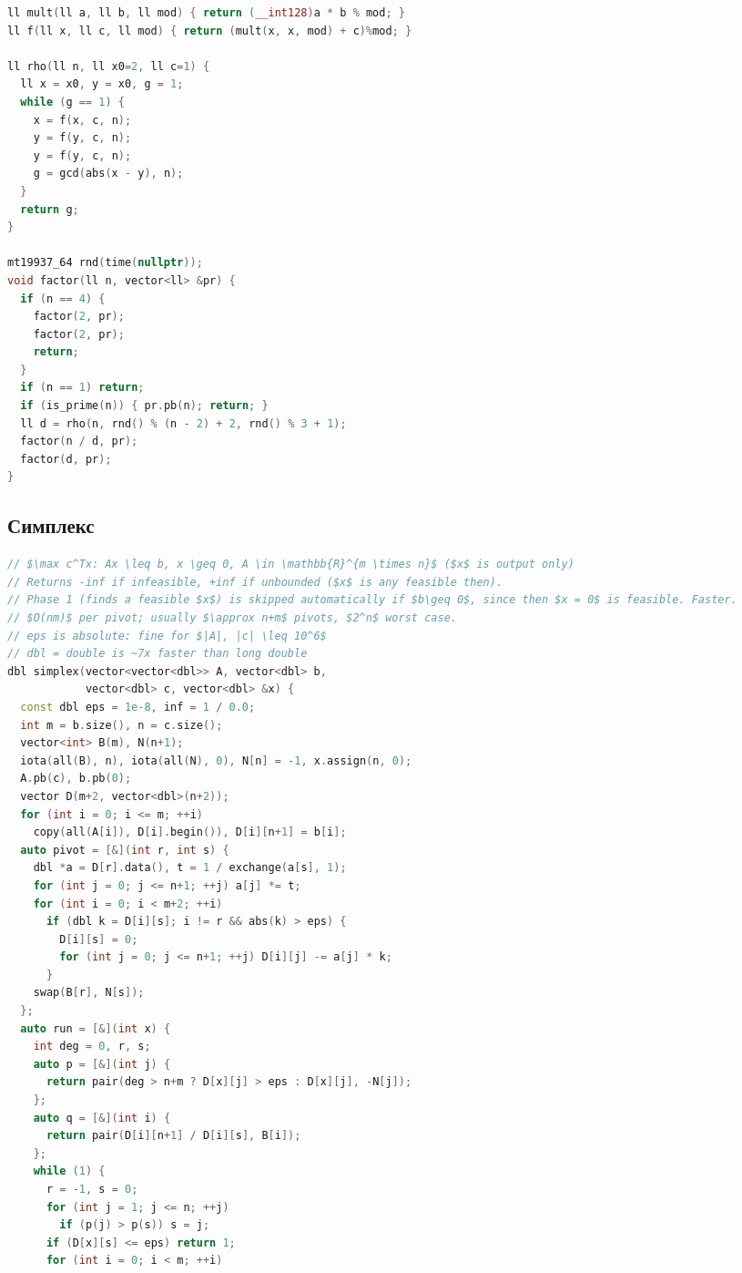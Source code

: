\documentclass[8pt,a4paper,landscape,twosided]{extarticle}
\begin{document}
\begin{multicols*}{3}
\begin{lstlisting}[language=C++]
ll mult(ll a, ll b, ll mod) { return (__int128)a * b % mod; }
ll f(ll x, ll c, ll mod) { return (mult(x, x, mod) + c)%mod; }

ll rho(ll n, ll x0=2, ll c=1) {
  ll x = x0, y = x0, g = 1;
  while (g == 1) {
    x = f(x, c, n);
    y = f(y, c, n);
    y = f(y, c, n);
    g = gcd(abs(x - y), n);
  }
  return g;
}

mt19937_64 rnd(time(nullptr));
void factor(ll n, vector<ll> &pr) {
  if (n == 4) {
    factor(2, pr);
    factor(2, pr);
    return;
  }
  if (n == 1) return;
  if (is_prime(n)) { pr.pb(n); return; }
  ll d = rho(n, rnd() % (n - 2) + 2, rnd() % 3 + 1);
  factor(n / d, pr);
  factor(d, pr);
}
\end{lstlisting}

\subsection{Симплекс}
\begin{lstlisting}[language=C++]
// $\max c^Tx: Ax \leq b, x \geq 0, A \in \mathbb{R}^{m \times n}$ ($x$ is output only)
// Returns -inf if infeasible, +inf if unbounded ($x$ is any feasible then).
// Phase 1 (finds a feasible $x$) is skipped automatically if $b\geq 0$, since then $x = 0$ is feasible. Faster.
// $O(nm)$ per pivot; usually $\approx n+m$ pivots, $2^n$ worst case.
// eps is absolute: fine for $|A|, |c| \leq 10^6$
// dbl = double is ~7x faster than long double
dbl simplex(vector<vector<dbl>> A, vector<dbl> b,
            vector<dbl> c, vector<dbl> &x) {
  const dbl eps = 1e-8, inf = 1 / 0.0;
  int m = b.size(), n = c.size();
  vector<int> B(m), N(n+1);
  iota(all(B), n), iota(all(N), 0), N[n] = -1, x.assign(n, 0);
  A.pb(c), b.pb(0);
  vector D(m+2, vector<dbl>(n+2));
  for (int i = 0; i <= m; ++i)
    copy(all(A[i]), D[i].begin()), D[i][n+1] = b[i];
  auto pivot = [&](int r, int s) {
    dbl *a = D[r].data(), t = 1 / exchange(a[s], 1);
    for (int j = 0; j <= n+1; ++j) a[j] *= t;
    for (int i = 0; i < m+2; ++i)
      if (dbl k = D[i][s]; i != r && abs(k) > eps) {
        D[i][s] = 0;
        for (int j = 0; j <= n+1; ++j) D[i][j] -= a[j] * k;
      }
    swap(B[r], N[s]);
  };
  auto run = [&](int x) {
    int deg = 0, r, s;
    auto p = [&](int j) {
      return pair(deg > n+m ? D[x][j] > eps : D[x][j], -N[j]);
    };
    auto q = [&](int i) {
      return pair(D[i][n+1] / D[i][s], B[i]);
    };
    while (1) {
      r = -1, s = 0;
      for (int j = 1; j <= n; ++j)
        if (p(j) > p(s)) s = j;
      if (D[x][s] <= eps) return 1;
      for (int i = 0; i < m; ++i)

\end{lstlisting}
\end{multicols*}
\end{document}

